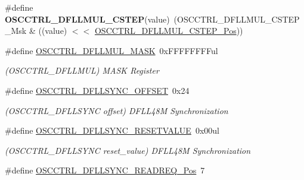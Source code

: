 \begin{DoxyCompactItemize}
\item 
\hypertarget{group___s_a_m_l21___o_s_c_c_t_r_l_gac03150c1a697e450aa1dc9979357fb22}{}\#define {\bfseries O\+S\+C\+C\+T\+R\+L\+\_\+\+D\+F\+L\+L\+M\+U\+L\+\_\+\+C\+S\+T\+E\+P}(value)~(O\+S\+C\+C\+T\+R\+L\+\_\+\+D\+F\+L\+L\+M\+U\+L\+\_\+\+C\+S\+T\+E\+P\+\_\+\+Msk \& ((value) $<$$<$ \hyperlink{group___s_a_m_l21___o_s_c_c_t_r_l_ga0c8450b117abc6c2de82b7b1fc96297a}{O\+S\+C\+C\+T\+R\+L\+\_\+\+D\+F\+L\+L\+M\+U\+L\+\_\+\+C\+S\+T\+E\+P\+\_\+\+Pos}))\label{group___s_a_m_l21___o_s_c_c_t_r_l_gac03150c1a697e450aa1dc9979357fb22}

\item 
\hypertarget{group___s_a_m_l21___o_s_c_c_t_r_l_gaf806f0aed246525bd1f1244e66da2550}{}\#define \hyperlink{group___s_a_m_l21___o_s_c_c_t_r_l_gaf806f0aed246525bd1f1244e66da2550}{O\+S\+C\+C\+T\+R\+L\+\_\+\+D\+F\+L\+L\+M\+U\+L\+\_\+\+M\+A\+S\+K}~0x\+F\+F\+F\+F\+F\+F\+F\+Ful\label{group___s_a_m_l21___o_s_c_c_t_r_l_gaf806f0aed246525bd1f1244e66da2550}

\begin{DoxyCompactList}\small\item\em (O\+S\+C\+C\+T\+R\+L\+\_\+\+D\+F\+L\+L\+M\+U\+L) M\+A\+S\+K Register \end{DoxyCompactList}\item 
\hypertarget{group___s_a_m_l21___o_s_c_c_t_r_l_gae788363f83086b565eb6735cbb2e9ea0}{}\#define \hyperlink{group___s_a_m_l21___o_s_c_c_t_r_l_gae788363f83086b565eb6735cbb2e9ea0}{O\+S\+C\+C\+T\+R\+L\+\_\+\+D\+F\+L\+L\+S\+Y\+N\+C\+\_\+\+O\+F\+F\+S\+E\+T}~0x24\label{group___s_a_m_l21___o_s_c_c_t_r_l_gae788363f83086b565eb6735cbb2e9ea0}

\begin{DoxyCompactList}\small\item\em (O\+S\+C\+C\+T\+R\+L\+\_\+\+D\+F\+L\+L\+S\+Y\+N\+C offset) D\+F\+L\+L48\+M Synchronization \end{DoxyCompactList}\item 
\hypertarget{group___s_a_m_l21___o_s_c_c_t_r_l_gae8a44ba0fa19b83e9660609fcad38949}{}\#define \hyperlink{group___s_a_m_l21___o_s_c_c_t_r_l_gae8a44ba0fa19b83e9660609fcad38949}{O\+S\+C\+C\+T\+R\+L\+\_\+\+D\+F\+L\+L\+S\+Y\+N\+C\+\_\+\+R\+E\+S\+E\+T\+V\+A\+L\+U\+E}~0x00ul\label{group___s_a_m_l21___o_s_c_c_t_r_l_gae8a44ba0fa19b83e9660609fcad38949}

\begin{DoxyCompactList}\small\item\em (O\+S\+C\+C\+T\+R\+L\+\_\+\+D\+F\+L\+L\+S\+Y\+N\+C reset\+\_\+value) D\+F\+L\+L48\+M Synchronization \end{DoxyCompactList}\item 
\hypertarget{group___s_a_m_l21___o_s_c_c_t_r_l_ga472567b17d32d3720efbbb46d231dbd4}{}\#define \hyperlink{group___s_a_m_l21___o_s_c_c_t_r_l_ga472567b17d32d3720efbbb46d231dbd4}{O\+S\+C\+C\+T\+R\+L\+\_\+\+D\+F\+L\+L\+S\+Y\+N\+C\+\_\+\+R\+E\+A\+D\+R\+E\+Q\+\_\+\+Pos}~7\label{group___s_a_m_l21___o_s_c_c_t_r_l_ga472567b17d32d3720efbbb46d231dbd4}


\end{DoxyCompactItemize}
